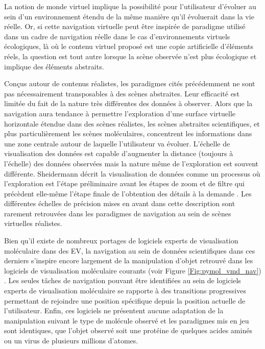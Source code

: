 La notion de monde virtuel implique la possibilité pour l'utilisateur d'évoluer au sein d'un environnement étendu de la même manière qu'il évoluerait dans la vie réelle. Or, si cette navigation virtuelle peut être inspirée de paradigme utilisé dans un cadre de navigation réelle dans le cas d'environnements virtuels écologiques, là où le contenu virtuel proposé est une copie artificielle d'éléments réels, la question est tout autre lorsque la scène observée n'est plus écologique et implique des éléments abstraits. 


Conçus autour de contenus réalistes, les paradigmes cités précédemment ne sont pas nécessairement transposables à des scènes abstraites. Leur efficacité est limitée du fait de la nature très différentes des données à observer. Alors que la navigation aura tendance à permettre l'exploration d'une surface virtuelle horizontale étendue dans des scènes réalistes, les scènes abstraites scientifiques, et plus particulièrement les scènes moléculaires, concentrent les informations dans une zone centrale autour de laquelle l'utilisateur va évoluer. L'échelle de visualisation des données est capable d'augmenter la distance (toujours à l'échelle) des données observées mais la nature même de l'exploration est souvent différente. Sheidermann décrit la visualisation de données comme un processus où l'exploration est l'étape préliminaire avant les étapes de zoom et de filtre qui précèdent elle-même l'étape finale de l'obtention des détails à la demande \cite{shneiderman_eyes_1996}. Les différentes échelles de précision mises en avant dans cette description sont rarement retrouvées dans les paradigmes de navigation au sein de scènes virtuelles réalistes.

Bien qu'il existe de nombreux portages de logiciels experts de visualisation moléculaire dans des EV, la navigation au sein de données scientifiques dans ces derniers s’inspire encore largement de la manipulation d'objet retrouvé dans les logiciels de visualisation moléculaire courants (voir Figure \ref{Fig:pymol_vmd_nav}) \cite{frohlich1999exploring}. Les seules tâches de navigation pouvant être identifiées au sein de logiciels experts de visualisation moléculaire se rapporte à des transitions progressives permettant de rejoindre une position spécifique depuis la position actuelle de l'utilisateur. Enfin, ces logiciels ne présentent aucune adaptation de la manipulation suivant le type de molécule observé et les paradigmes mis en jeu sont identiques, que l'objet observé soit une protéine de quelques acides aminés ou un virus de plusieurs millions d'atomes.


